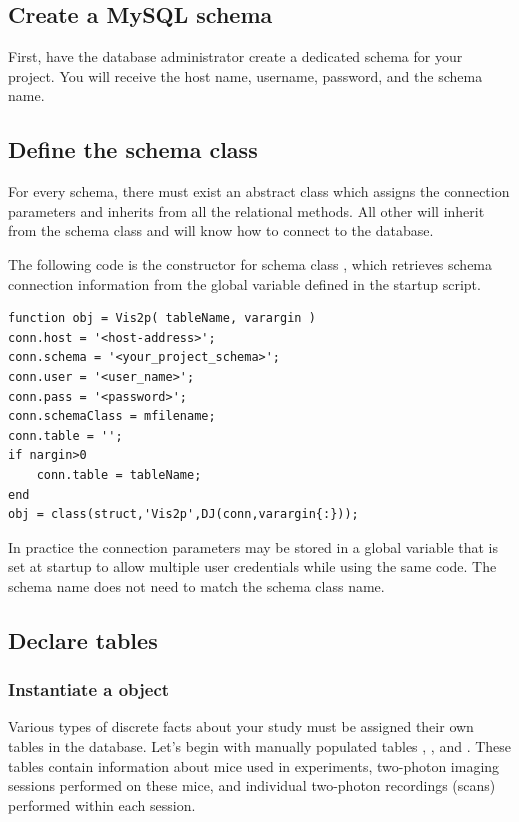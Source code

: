 \documentclass[10pt]{article}
\begin{document}
\subsection{Create a MySQL schema}
First, have the database administrator create a dedicated schema for your project.  You will receive the host name, username, password, and the schema name.

\subsection{Define the schema class}

For every schema, there must exist an abstract class which assigns the connection parameters and inherits from  all the relational methods.  All other will inherit from the schema class and will know how to connect to the database.  

The following code is the constructor for schema class , which retrieves schema connection information from the global variable defined in the startup script. 

\begin{lstlisting}
function obj = Vis2p( tableName, varargin )
conn.host = '<host-address>';
conn.schema = '<your_project_schema>';
conn.user = '<user_name>';
conn.pass = '<password>';
conn.schemaClass = mfilename;
conn.table = '';
if nargin>0
    conn.table = tableName;
end
obj = class(struct,'Vis2p',DJ(conn,varargin{:})); 
\end{lstlisting}

In practice the connection parameters may be stored in a global variable that is set at startup to allow multiple user credentials while using the same code.  The schema name does not need to match the schema class name.

\subsection{Declare tables} 
\subsubsection{Instantiate a  object}
Various types of discrete facts about your study must be assigned their own tables in the database. Let's begin with manually populated tables , , and . These tables contain information about mice used in experiments, two-photon imaging sessions performed on these mice, and individual two-photon recordings (scans) performed within each session.  
\end{document}
